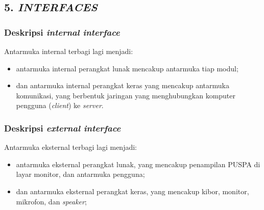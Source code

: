 \subsection*{\textcolor{subsectioncolor}{\textsf{5. \textit{INTERFACES}}}}

\subsubsection*{Deskripsi \textit{internal interface}}
Antarmuka internal terbagi lagi menjadi:
\begin{itemize}
\item antarmuka internal perangkat lunak mencakup antarmuka tiap modul;
\item dan antarmuka internal perangkat keras yang mencakup antarmuka komunikasi, yang berbentuk jaringan yang menghubungkan komputer pengguna (\textit{client}) ke \textit{server}.
\end{itemize}

\subsubsection*{Deskripsi \textit{external interface}}
Antarmuka eksternal terbagi lagi menjadi:
\begin{itemize}
\item antarmuka eksternal perangkat lunak, yang mencakup penampilan PUSPA di layar monitor, dan antarmuka pengguna;
\item dan antarmuka eksternal perangkat keras, yang mencakup kibor, monitor, mikrofon, dan \textit{speaker};
\end{itemize}

